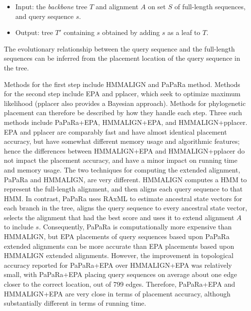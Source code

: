 \begin{itemize}
\item Input: the {\em backbone} tree $T$ and alignment $A$ on set $S$ of full-length sequences,
and query sequence $s$.
\item Output: tree $T'$ containing $s$ obtained by adding $s$ as a leaf to
$T$.
\end{itemize}

The evolutionary relationship between the query sequence and the full-length sequences can be inferred from the placement location of the query sequence in the tree.

Methods for the first step 
include HMMALIGN\cite{Eddy1998}
and PaPaRa\cite{Berger2011a} method.  
Methods for the second step include 
 EPA\cite{Berger2011} and pplacer\cite{Matsen2010}, which
seek to optimize maximum likelihood
(pplacer also provides a Bayesian approach).
Methods for phylogenetic placement can therefore
be described
by how they handle each step.
Three such methods
include PaPaRa+EPA\cite{Berger2011a},
HMMALIGN+EPA\cite{Berger2011},
and HMMALIGN+pplacer\cite{Matsen2010}.
EPA and pplacer are comparably 
fast and have almost identical 
placement accuracy,
  but have somewhat different memory usage and algorithmic features\cite{Matsen2010};
hence the differences between HMMALIGN+EPA and HMMALIGN+pplacer
do not impact the placement accuracy, and have a minor
impact on running time and memory usage.
The two techniques for computing the extended alignment,
PaPaRa and HMMALIGN, are very different.
HMMALIGN computes a HMM to represent the full-length alignment,
and then aligns each query sequence to that HMM.  In contrast,
PaPaRa uses RAxML to estimate ancestral state 
vectors for each branch in the
tree, aligns the query sequence to every ancestral state
vector, selects the alignment that had the best score and uses
it to extend
alignment $A$ to include $s$.
Consequently, PaPaRa is computationally more 
expensive than HMMALIGN\cite{Berger2011a}, but EPA placements
of query sequences based upon PaPaRa extended alignments can be
more accurate than EPA placements based upon HMMALIGN extended alignments.
However, the improvement in topological accuracy reported\cite{Berger2011a}  for
PaPaRa+EPA over HMMALIGN+EPA was
relatively small, with PaPaRa+EPA placing
query sequences on average
about one edge closer to the correct
location, out of 799 edges. 
Therefore, PaPaRa+EPA and HMMALIGN+EPA are very close
in terms of placement accuracy, although substantially different
in terms of running time.


